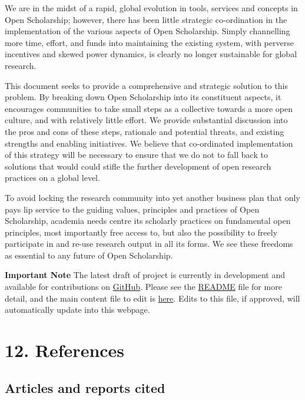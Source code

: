 We are in the midst of a rapid, global evolution in tools, services and
concepts in Open Scholarship; however, there has been little strategic
co-ordination in the implementation of the various aspects of Open
Scholarship. Simply channelling more time, effort, and funds into
maintaining the existing system, with perverse incentives and skewed
power dynamics, is clearly no longer sustainable for global research.

This document seeks to provide a comprehensive and strategic solution to
this problem. By breaking down Open Scholarship into its constituent
aspects, it encourages communities to take small steps as a collective
towards a more open culture, and with relatively little effort. We
provide substantial discussion into the pros and cons of these steps,
rationale and potential threats, and existing strengths and enabling
initiatives. We believe that co-ordinated implementation of this
strategy will be necessary to ensure that we do not to fall back to
solutions that would could stifle the further development of open
research practices on a global level.

To avoid locking the research community into yet another business plan
that only pays lip service to the guiding values, principles and
practices of Open Scholarship, academia needs centre its scholarly
practices on fundamental open principles, most importantly free access
to, but also the possibility to freely participate in and re-use
research output in all its forms. We see these freedoms as essential to
any future of Open Scholarship.

\textbf{Important Note} The latest draft of project is currently in
development and available for contributions on
\href{https://github.com/Open-Scholarship-Strategy/site}{GitHub}. Please
see the
\href{https://github.com/Open-Scholarship-Strategy/site/blob/master/README.md}{README}
file for more detail, and the main content file to edit is
\href{https://github.com/Open-Scholarship-Strategy/site/blob/master/index.md}{here}.
Edits to this file, if approved, will automatically update into this
webpage.

\section{12. References }\label{references}

\subsection{Articles and reports
cited}\label{articles-and-reports-cited}

